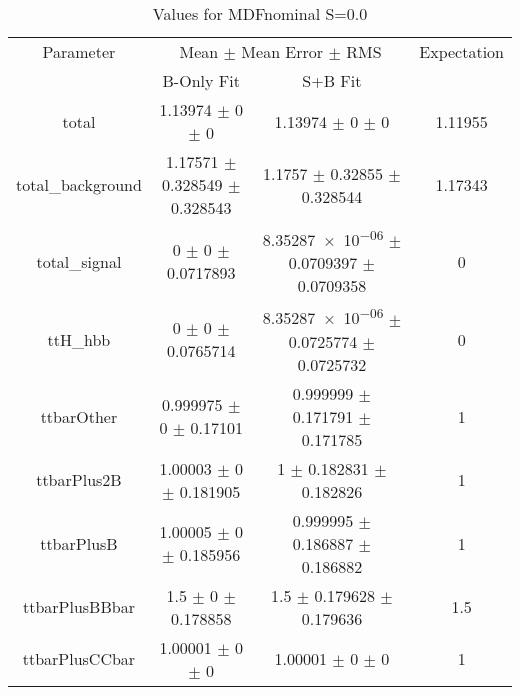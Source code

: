 \begin{table}
\centering
\caption{Values for MDFnominal S=0.0}
\begin{tabular}{cccc}
\toprule
Parameter & \multicolumn{2}{c}{Mean $\pm$ Mean Error $\pm$ RMS} & Expectation\\
 & B-Only Fit & S+B Fit & \\
\midrule
total & \num{1.13974} $\pm$ \num{0} $\pm$ \num{0} & \num{1.13974} $\pm$ \num{0} $\pm$ \num{0} & \num{1.11955}\\
total\_background & \num{1.17571} $\pm$ \num{0.328549} $\pm$ \num{0.328543} & \num{1.1757} $\pm$ \num{0.32855} $\pm$ \num{0.328544} & \num{1.17343}\\
total\_signal & \num{0} $\pm$ \num{0} $\pm$ \num{0.0717893} & \num{8.35287e-06} $\pm$ \num{0.0709397} $\pm$ \num{0.0709358} & \num{0}\\
ttH\_hbb & \num{0} $\pm$ \num{0} $\pm$ \num{0.0765714} & \num{8.35287e-06} $\pm$ \num{0.0725774} $\pm$ \num{0.0725732} & \num{0}\\
ttbarOther & \num{0.999975} $\pm$ \num{0} $\pm$ \num{0.17101} & \num{0.999999} $\pm$ \num{0.171791} $\pm$ \num{0.171785} & \num{1}\\
ttbarPlus2B & \num{1.00003} $\pm$ \num{0} $\pm$ \num{0.181905} & \num{1} $\pm$ \num{0.182831} $\pm$ \num{0.182826} & \num{1}\\
ttbarPlusB & \num{1.00005} $\pm$ \num{0} $\pm$ \num{0.185956} & \num{0.999995} $\pm$ \num{0.186887} $\pm$ \num{0.186882} & \num{1}\\
ttbarPlusBBbar & \num{1.5} $\pm$ \num{0} $\pm$ \num{0.178858} & \num{1.5} $\pm$ \num{0.179628} $\pm$ \num{0.179636} & \num{1.5}\\
ttbarPlusCCbar & \num{1.00001} $\pm$ \num{0} $\pm$ \num{0} & \num{1.00001} $\pm$ \num{0} $\pm$ \num{0} & \num{1}\\
\bottomrule
\end{tabular}
\end{table}